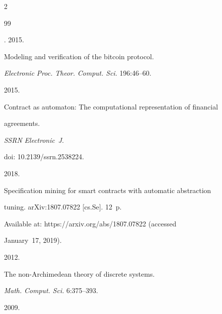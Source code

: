\begin{multicols}{2}
{{\begin{thebibliography}{99}


. 2015.


Modeling and verification of the bitcoin protocol.




\textit{Electronic Proc. Theor. Comput. Sci.} 196:46--60.


  




 2015.


 Contract as automaton: The computational representation of financial


  agreements.


\textit{SSRN Electronic~J}.


doi: 10.2139/\linebreak ssrn.2538224.


  






2018.


 Specification mining for smart contracts with automatic abstraction


  tuning.  arXiv:1807.07822 [cs.Se]. 12~p.


Available at: {\sf https://arxiv.org/abs/1807.07822} (accessed


  January~17, 2019).


  




 2012.


The non-{A}rchimedean theory of discrete systems.


\textit{Math. Comput. Sci.} 6:375--393.
















  2009.



\end{thebibliography}}}
\end{multicols}
